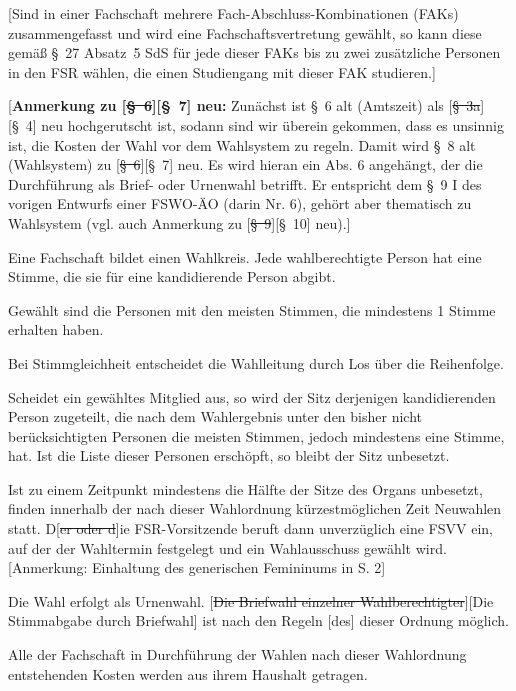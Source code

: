 \documentclass[%
draft,%
multilinesections%
]{fswo}
\newcommand\oldT[1]  {{\color{Gray}[\st{#1}]}}
\newcommand\newT[1]  {{\color{Green}[#1]}}
\newcommand\bemFr[1] {{\color{Red}[#1]}}
\newcommand\oldT[1]{}%
\newcommand\newT[1]{#1}
\newcommand\bemFr[1]{}%
\newcommand\change[2]{\oldT{#1}\newT{#2}}
\begin{document}
\begin{contract}
\newT{Sind in einer Fachschaft mehrere Fach-Abschluss-Kombinationen (FAKs) zusammengefasst und wird eine Fachschaftsvertretung gewählt, so kann diese gemäß \S~27 Absatz~5 SdS für jede dieser FAKs bis zu zwei zusätzliche Personen in den FSR wählen, die einen Studiengang mit dieser FAK studieren.\label{cls-wahl-fsr:abs-fak}}
\end{contract}

\bemFr{\textbf{Anmerkung zu \change{\S~6}{\S~7} neu:} Zunächst ist \S~6 alt (Amtszeit) als \change{\S~3a}{\S~4} neu hochgerutscht ist, sodann sind wir überein gekommen, dass es unsinnig ist, die Kosten der Wahl vor dem Wahlsystem zu regeln. Damit wird \S~8 alt (Wahlsystem) zu \change{\S~6}{\S~7} neu. Es wird hieran ein Abs. 6 angehängt, der die Durchführung als Brief- oder Urnenwahl betrifft. Er entspricht dem \S~9 I des vorigen Entwurfs einer FSWO-ÄO (darin Nr. 6), gehört aber thematisch zu Wahlsystem (vgl. auch Anmerkung zu \change{\S~9}{\S~10} neu).}

\begin{contract}
\label{cls-wahlsystem}
Eine Fachschaft bildet einen Wahlkreis.
Jede wahlberechtigte Person hat eine Stimme, die sie für eine kandidierende Person abgibt.

Gewählt sind die Personen mit den meisten Stimmen, die mindestens 1 Stimme erhalten haben.

Bei Stimmgleichheit entscheidet die Wahlleitung durch Los über die Reihenfolge.

Scheidet ein gewähltes Mitglied aus, so wird der Sitz derjenigen kandidierenden Person zugeteilt, die nach dem Wahlergebnis unter den bisher nicht berücksichtigten Personen die meisten Stimmen, jedoch mindestens eine Stimme, hat.
Ist die Liste dieser Personen erschöpft, so bleibt der Sitz unbesetzt.

Ist zu einem Zeitpunkt mindestens die Hälfte der Sitze des Organs unbesetzt, finden innerhalb der nach dieser Wahlordnung kürzestmöglichen Zeit Neuwahlen statt.
D\oldT{er oder d}ie FSR-Vorsitzende beruft dann unverzüglich eine FSVV ein, auf der der Wahltermin festgelegt und ein Wahlausschuss gewählt wird. \bemFr{Anmerkung: Einhaltung des generischen Femininums in S. 2}

Die Wahl erfolgt als Urnenwahl.
\change{Die Briefwahl einzelner Wahlberechtigter}{Die Stimmabgabe durch Briefwahl} ist nach den Regeln \newT{des}  dieser Ordnung möglich.


Alle der Fachschaft in Durchführung der Wahlen nach dieser Wahlordnung entstehenden Kosten werden aus ihrem Haushalt getragen.
\end{contract}
\end{document}
